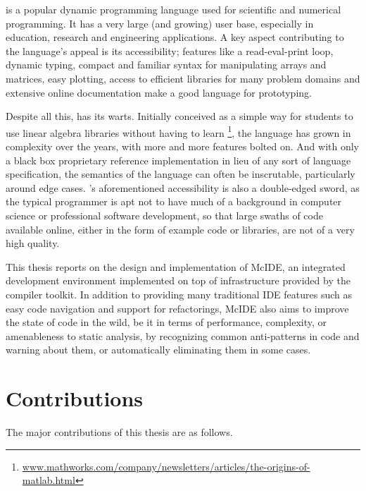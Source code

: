 \matlab is a popular dynamic programming language used for scientific and
numerical programming. It has a very large (and growing) user base, especially
in education, research and engineering applications. A key aspect contributing
to the language's appeal is its accessibility; features like a read-eval-print
loop, dynamic typing, compact and familiar syntax for manipulating arrays and
matrices, easy plotting, access to efficient libraries for many problem domains
and extensive online documentation make \matlab a good language for
prototyping.

Despite all this, \matlab has its warts. Initially conceived as a simple way
for students to use \fortran linear algebra libraries without having to learn
\fortran\footnote{\url{www.mathworks.com/company/newsletters/articles/the-origins-of-matlab.html}},
the language has grown in complexity over the years, with more and more
features bolted on. And with only a black box proprietary reference
implementation in lieu of any sort of language specification, the semantics of
the language can often be inscrutable, particularly around edge cases.
\matlab's aforementioned accessibility is also a double-edged sword, as the
typical \matlab programmer is apt not to have much of a background in computer
science or professional software development, so that large swaths of \matlab
code available online, either in the form of example code or libraries, are not
of a very high quality.

This thesis reports on the design and implementation of McIDE, an integrated
development environment implemented on top of infrastructure provided by the
\mclab compiler toolkit. In addition to providing many traditional IDE features
such as easy code navigation and support for refactorings, McIDE also aims to
improve the state of \matlab code in the wild, be it in terms of performance,
complexity, or amenableness to static analysis, by recognizing common
anti-patterns in \matlab code and warning about them, or automatically
eliminating them in some cases.

\section{Contributions}

The major contributions of this thesis are as follows.

